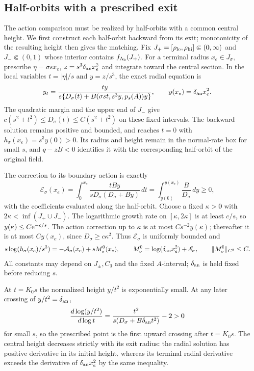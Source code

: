 \subsection{Half-orbits with a prescribed exit}

The action comparison must be realized by half-orbits with a common
central height. We first construct each half-orbit backward from its
exit; monotonicity of the resulting height then gives the matching.
Fix \(J_+=[\rho_{\rm lo},\rho_{\rm hi}]\Subset(0,\infty)\) and
\(J_-\Subset(0,1)\) whose interior contains
\(f_{\Lambda_{\rm b}}(J_+)\). For a terminal radius
\(x_e\in J_\sigma\), prescribe
\(\eta=\sigma sx_e\), \(z=s^3\delta_{\rm an}x_e^2\) and integrate
toward the central section. In the local variables \(t=|\eta|/s\)
and \(y=z/s^3\), the exact radial equation is
\[
 y_t=\frac{ty}{s\{D_\sigma(t)+B(\sigma st,s^3y,p_s(A))y\}},
 \qquad y(x_e)=\delta_{\rm an}x_e^2.
\]
The quadratic margin and the upper end of \(J_-\) give
\(c(s^2+t^2)\le D_\sigma(t)\le C(s^2+t^2)\) on these fixed
intervals. The backward solution remains positive and bounded,
and reaches \(t=0\) with \(h_\sigma(x_e)=s^3y(0)>0\).
Its radius and height remain in the normal-rate box for small \(s\),
and \(q-zB<0\) identifies it with the corresponding half-orbit
of the original field.

The correction to its boundary action is exactly
\[
 \mathscr E_\sigma(x_e)
 =\int_0^{x_e}\frac{tBy}{sD_\sigma(D_\sigma+By)}\,dt
 =\int_{y(0)}^{y(x_e)}\frac{B}{D_\sigma}\,dy\ge0,
\]
with the coefficients evaluated along the half-orbit.
Choose a fixed \(\kappa>0\) with \(2\kappa<\inf(J_+\cup J_-)\).
The logarithmic growth rate on \([\kappa,2\kappa]\) is at least
\(c/s\), so \(y(\kappa)\le C\mathrm e^{-c/s}\).
The action correction up to \(\kappa\) is at most
\(Cs^{-2}y(\kappa)\); thereafter it is at most \(Cy(x_e)\),
since \(D_\sigma\ge c\kappa^2\). Thus
\(\mathscr E_\sigma\) is uniformly bounded and
\begin{equation}
\label{eq:sharpness-common-source}
 s\log(h_\sigma(x_e)/s^3)=-\mathcal A_\sigma(x_e)
                   +sM_\sigma^0(x_e),\qquad
 M_\sigma^0=\log(\delta_{\rm an}x_e^2)+\mathscr E_\sigma,
 \qquad \|M_\sigma^0\|_{C^0}\le C.
\end{equation}
All constants may depend on \(J_\pm,C_0\) and the fixed \(A\)-interval;
\(\delta_{\rm an}\) is held fixed before reducing \(s\).

At \(t=K_0s\) the normalized height
\(y/t^2\) is exponentially small. At any later crossing of
\(y/t^2=\delta_{\rm an}\),
\[
 \frac{d\log(y/t^2)}{d\log t}
 =\frac{t^2}{s(D_\sigma+B\delta_{\rm an}t^2)}-2>0
\]
for small \(s\), so the prescribed point is the first upward crossing
after \(t=K_0s\).
The central height decreases strictly with its exit radius:
the radial solution has positive derivative in its initial height,
whereas its terminal radial derivative exceeds the derivative of
\(\delta_{\rm an}x_e^2\) by the same inequality.

